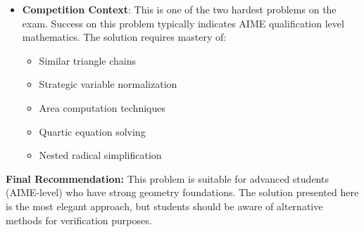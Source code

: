 \documentclass[]{article}
\begin{document}
\begin{itemize}[leftmargin=*]
    \item \textbf{Competition Context}: This is one of the two hardest problems on the exam. Success on this problem typically indicates AIME qualification level mathematics. The solution requires mastery of:
    \begin{itemize}
        \item Similar triangle chains
        \item Strategic variable normalization
        \item Area computation techniques
        \item Quartic equation solving
        \item Nested radical simplification
    \end{itemize}
\end{itemize}

\textbf{Final Recommendation:} This problem is suitable for advanced students (AIME-level) who have strong geometry foundations. The solution presented here is the most elegant approach, but students should be aware of alternative methods for verification purposes.
\end{document}
